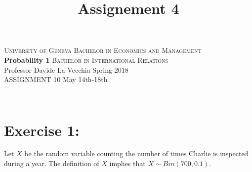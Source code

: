 \documentclass[12pt,thmsa]{article}
\title{Assignement 4}
\begin{document}
\noindent \textsc{University of Geneva}     \hfill \textsc{Bachelor in Economics and Management} \\
\textbf{Probability 1}                      \hfill \textsc{Bachelor in International Relations} \\
Professor Davide La Vecchia                 \hfill Spring 2018  \\
ASSIGNMENT 10                               \hfill   May 14th-18th



\noindent
\makebox[\linewidth]{\rule{\textwidth}{0.4pt}}\\[1.5ex]







\section*{Exercise 1:}


Let $X$ be the random variable counting the number of times Charlie is inspected during a year. The definition of $X$ implies that $X\sim Bin(700,0.1)$.
\end{document}
